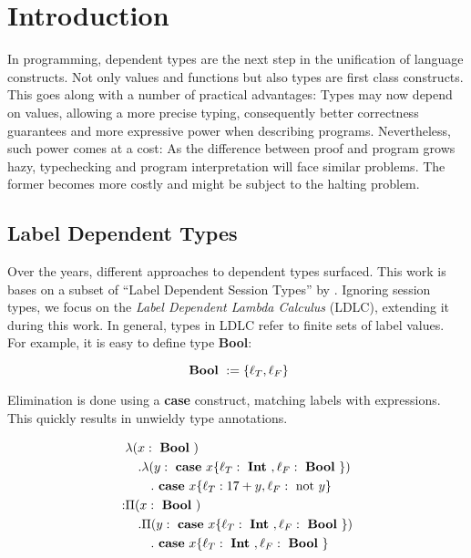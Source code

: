 \chapter{Introduction}\label{chap:introduction}

In programming, dependent types are the next step in the unification of language constructs. Not only values and functions but also types are first class constructs. This goes along with a number of practical advantages: Types may now depend on values, allowing a more precise typing, consequently better correctness guarantees and more expressive power when describing programs. Nevertheless, such power comes at a cost: As the difference between proof and program grows hazy, typechecking and program interpretation will face similar problems. The former becomes more costly and might be subject to the halting problem.

\section{Label Dependent Types}

Over the years, different approaches to dependent types surfaced. This work is bases on a subset of ``Label Dependent Session Types'' by \cite{thiemann2019}. Ignoring session types, we focus on the \emph{Label Dependent Lambda Calculus} (LDLC), extending it during this work. In general, types in LDLC refer to finite sets of label values. For example, it is easy to define type \textbf{Bool}:

\begin{equation}\label{eqn:bool}
\text{ \textbf{Bool} }    := \{\ell_T, \ell_F\}
\end{equation}

Elimination is done using a \textbf{case} construct, matching labels with expressions. This quickly results in unwieldy type annotations.

\begin{equation}\label{eqn:ldlc}
\begin{split}
&\lambda (x: \text{ \textbf{Bool} }) \\
&\quad . \lambda (y: \text{ \textbf{case} } x \{\ell_T: \text{ \textbf{Int} }, \ell_F: \text{ \textbf{Bool} }\} ) \\
&\qquad . \text{ \textbf{case} } x \{\ell_T: 17+y,\ell_F: \text{ not } y\} \\
: & \Pi(x : \text{ \textbf{Bool} }) \\
&\quad . \Pi (y: \text{ \textbf{case} } x \{\ell_T: \text{ \textbf{Int} }, \ell_F: \text{ \textbf{Bool} }\} ) \\
&\qquad . \text{ \textbf{case} } x \{\ell_T: \text{ \textbf{Int} }, \ell_F: \text{ \textbf{Bool} } \}
\end{split}
\end{equation}


